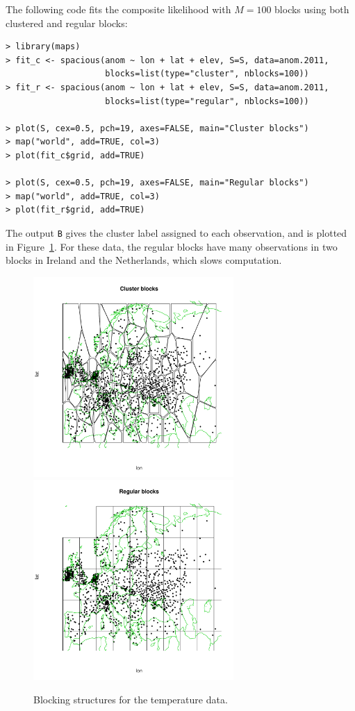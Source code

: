 \documentclass[11pt]{article}
\begin{document}
The following code fits the composite likelihood with $M=100$ blocks using both clustered and regular blocks:

\begin{verbatim}
> library(maps)
> fit_c <- spacious(anom ~ lon + lat + elev, S=S, data=anom.2011,
                    blocks=list(type="cluster", nblocks=100))
> fit_r <- spacious(anom ~ lon + lat + elev, S=S, data=anom.2011,
                    blocks=list(type="regular", nblocks=100))

> plot(S, cex=0.5, pch=19, axes=FALSE, main="Cluster blocks")
> map("world", add=TRUE, col=3)
> plot(fit_c$grid, add=TRUE)

> plot(S, cex=0.5, pch=19, axes=FALSE, main="Regular blocks")
> map("world", add=TRUE, col=3)
> plot(fit_r$grid, add=TRUE)
\end{verbatim}

The output {\tt B} gives the cluster label assigned to each observation, and is plotted in Figure~\ref{f:blocks}.
For these data, the regular blocks have many observations in two blocks in Ireland and the Netherlands, which slows computation.

\begin{figure}
	\caption{Blocking structures for the temperature data.}\label{f:blocks}
	\centering
	\includegraphics[width=3in]{figures/blocks_c.pdf}
	\includegraphics[width=3in]{figures/blocks_r.pdf}
\end{figure}
\end{document}
